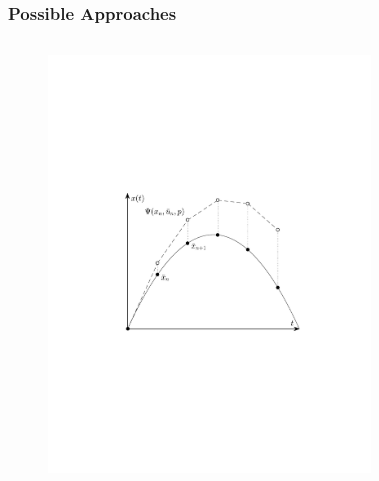 \begin{frame}
    \frametitle{Possible Approaches}

    \begin{columns}[t]
            \begin{figure}
                \centering
                \includegraphics[trim=3cm 7cm 3cm 9cm, clip=true, width=\linewidth]{img/contExplEulerPlot}
            \end{figure}
            \begin{figure}
                \centering

\end{figure}
\end{columns}
\end{frame}
